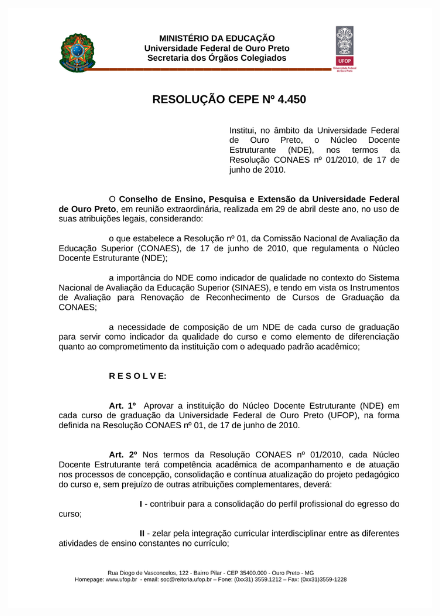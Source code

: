 \label{cepe4450}
\begin{figure}[p]
	\centering 
	\includegraphics[scale=0.7]{capitulos/resolucoes/cepe4450/cepe4450-p1.pdf}
\end{figure} \pagebreak

